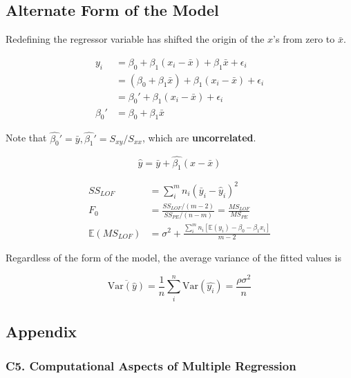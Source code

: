 \documentclass[12pt]{article}
\begin{document}
\subsection{Alternate Form of the Model}

Redefining the regressor variable has shifted the origin of the $x$'s from zero to $\bar{x}$.

$$
\begin{aligned}
y_i &= \beta_0 + \beta_1 (x_i - \bar{x}) + \beta_1 \bar{x} + \epsilon_i \\
&= (\beta_0 + \beta_1 \bar{x}) + \beta_1 (x_i - \bar{x}) + \epsilon_i \\
&= \beta_0' + \beta_1 (x_i - \bar{x}) + \epsilon_i \\[10pt]
\beta_0' &= \beta_0 + \beta_1 \bar{x}
\end{aligned}
$$

Note that $\hat{\beta_0}' = \bar{y}, \hat{\beta_1}' = S_{xy}/S_{xx}$, which are \textbf{uncorrelated}.

$$
\hat{y} = \bar{y} + \hat{\beta_1} ( x - \bar{x})
$$



$$
\begin{aligned}
SS_{LOF} &= \sum_i^m n_i (\bar{y}_i - \hat{y}_i)^2 \\[10pt]
F_0 &= \frac{ SS_{LOF}/(m-2)  }{ SS_{PE}/(n-m)  } = \frac{MS_{LOF}}{MS_{PE}} \\[10pt]
\mathbb{E}(MS_{LOF}) &= \sigma^2 + \frac{ \sum_i^m n_i [ \mathbb{E}(y_i) - \beta_0 - \beta_1 x_i ]  }{m-2}
\end{aligned}
$$

Regardless of the form of the model, the average variance of the fitted values is

$$
\overline{ \mathrm{Var}(\hat{y}) } = \frac{1}{n} \sum_i^n \mathrm{Var} (\hat{y_i}) = \frac{\rho\sigma^2}{n}
$$




\pagebreak
\subsection*{Appendix}

\subsubsection*{C5. Computational Aspects of Multiple Regression}
\end{document}
